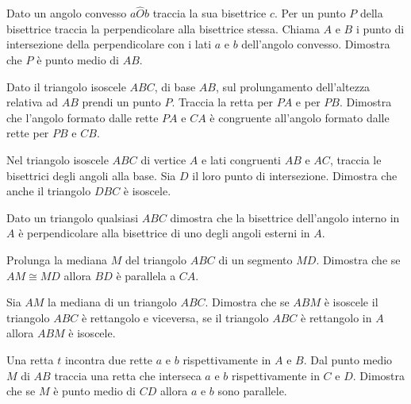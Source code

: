 \begin{multicols}{2}
\begin{esercizio}
\label{ese:3.63}
Dato un angolo convesso $a\widehat{O}b$ traccia la sua bisettrice $c$. Per un punto $P$ della bisettrice traccia la perpendicolare alla bisettrice stessa. Chiama $A$ e $B$ i punto di intersezione della perpendicolare con i lati $a$ e $b$ dell'angolo convesso. Dimostra che $P$ è punto medio di $AB$.
\end{esercizio}

\begin{esercizio}
\label{ese:3.64}
Dato il triangolo isoscele $ABC$, di base $AB$, sul prolungamento dell'altezza relativa ad $AB$ prendi un punto $P$. Traccia la retta per $PA$ e per $PB$. Dimostra che l'angolo formato dalle rette $PA$ e $CA$ è congruente all'angolo formato dalle rette per $PB$ e $CB$.
\end{esercizio}

\begin{esercizio}
\label{ese:3.65}
Nel triangolo isoscele $ABC$ di vertice $A$ e lati congruenti $AB$ e $AC$, traccia le bisettrici degli angoli alla base. Sia $D$ il loro punto di intersezione. Dimostra che anche il triangolo $DBC$ è isoscele.
\end{esercizio}

\begin{esercizio}
\label{ese:3.66}
Dato un triangolo qualsiasi $ABC$ dimostra che la bisettrice dell'angolo interno in $A$ è perpendicolare alla bisettrice di uno degli angoli esterni in $A$.
\end{esercizio}

\begin{esercizio}
\label{ese:3.67}
Prolunga la mediana $M$ del triangolo $ABC$ di un segmento $MD$. Dimostra che se $AM\cong MD$ allora $BD$ è parallela a $CA$.
\end{esercizio}

\begin{esercizio}
\label{ese:3.68}
Sia $AM$ la mediana di un triangolo $ABC$. Dimostra che se $ABM$ è isoscele il triangolo $ABC$ è rettangolo e viceversa, se il triangolo $ABC$ è rettangolo in $A$ allora $ABM$ è isoscele.
\end{esercizio}

\begin{esercizio}
\label{ese:3.69}
Una retta $t$ incontra due rette $a$ e $b$ rispettivamente in $A$ e $B$. Dal punto medio $M$ di $AB$ traccia una retta che interseca $a$ e $b$ rispettivamente in $C$ e $D$. Dimostra che se $M$ è punto medio di $CD$ allora $a$ e $b$ sono parallele.
\end{esercizio}


\end{multicols}
